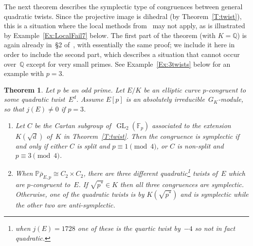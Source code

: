 \documentclass[twoside,leqno,symbols-for-thanks, draft]{rmi}
\numberwithin{equation}{section}
\newcommand{\Fp}{\mathbb{F}_p}
\newcommand{\PP}{\mathbb{P}}
\newcommand{\Q}{\mathbb{Q}}
\newcommand{\rhobar}{{\overline{\rho}}}
\newcommand{\GL}{\operatorname{GL}}
\newtheorem{theorem}{Theorem}[section]
\theoremstyle{remark}
\begin{document}
The next theorem describes the symplectic type of congruences between
general quadratic twists.  Since the projective image is dihedral (by
Theorem~\ref{T:twist}), this is a situation where the local
methods from~\cite{FKSym} may not apply, as is illustrated by
Example~\ref{Ex:LocalFail7} below.  The first part of the theorem
(with $K=\Q$) is again already in~\S2 of~\cite{Halberstadt-11nonsplit},
with essentially the same proof; we include it here in order to
include the second part, which describes a situation that cannot occur
over~$\Q$ except for very small primes. See Example~\ref{Ex:3twists}
below for an example with $p=3$.

\begin{theorem}\label{T:quadratic} 
Let $p$ be an odd prime. 
Let $E/K$ be an elliptic curve 
$p$-congruent to some quadratic twist~$E^d$.
Assume $E[p]$ is an absolutely irreducible~$G_K$-module, so that $j(E) \neq 0$ if $p=3$.

\begin{enumerate}
\item Let $C$ be the Cartan subgroup of~$\GL_2(\Fp)$
  associated to the extension $K(\sqrt{d})$ of~$K$ in
  Theorem~\ref{T:twist}.  Then the congruence is symplectic if and
  only if \emph{either} $C$ is split and $p \equiv 1 \pmod{4}$,
  \emph{or} $C$ is non-split and $p \equiv 3 \pmod{4}$.

\item When $\PP\rhobar_{E,p}\cong C_2\times C_2$, there are three
  different quadratic\footnote{when $j(E)=1728$ one of these
    is the quartic twist by~$-4$ so not in fact quadratic.}  twists
    of~$E$ which are $p$-congruent to~$E$.  If $\sqrt{p^*}\in K$ then
    all three congruences are symplectic.  Otherwise, one of the
    quadratic twists is by $K(\sqrt{p^*})$ and is symplectic while the
    other two are anti-symplectic.
\end{enumerate}
\end{theorem}
\end{document}

